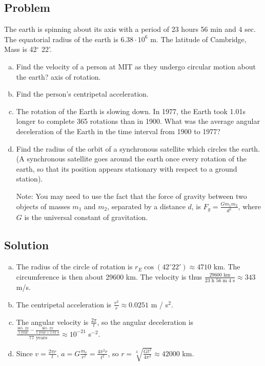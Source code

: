 \documentclass[solutions]{esg8012pset}
\begin{document}
\subsection{Problem}
  The earth is spinning about its axis with a period of 23 hours 56 min and 4 sec. The equatorial radius of the earth is $6.38\cdot 10^{6}$ m. The latitude of Cambridge, Mass is 42$^{\circ}$ 22'.
  \begin{enumerate}[a)]
    \item Find the velocity of a person at MIT as they undergo circular motion about the earth? axis of rotation.
    \item Find the person's centripetal acceleration.
    \item The rotation of the Earth is slowing down. In 1977, the Earth took 1.01s longer to complete 365 rotations than in 1900. What was the average angular deceleration of the Earth in the time interval from 1900 to 1977?
    \item Find the radius of the orbit of a synchronous satellite which circles the earth. (A synchronous satellite goes around the earth once every rotation of the earth, so that its position appears stationary with respect to a ground station).  \par\noindent
      Note: You may need to use the fact that the force of gravity between two objects of masses $m_1$ and $m_2$, separated by a distance $d$, is $F_g = \frac{G m_1 m_2}{d^2}$, where $G$ is the universal constant of gravitation.
  \end{enumerate}
\subsection{Solution}
  \begin{enumerate}[a)]
    \item The radius of the circle of rotation is $r_E \cos(42^{\circ} 22') \approx 4710$ km.  The circumference is then about 29600 km.  The velocity is thus $\frac{29600\text{ km}}{23\text{ h }56\text{ m }4\text{ s}} \approx 343$ m/s.
    \item The centripetal acceleration is $\frac{v^2}{r} \approx 0.0251$ m / s$^2$.
    \item The angular velocity is $\frac{2\pi}{t}$, so the angular deceleration is $\frac{\frac{365\cdot 2\pi}{1\text{ year}} - \frac{365\cdot 2\pi}{1\text{ year}+1.01\text{ s}}}{77\text{ years}} \approx 10^{-21}$ s$^{-2}$.
    \item Since $v = \frac{2\pi r}{t}$, $a = G\frac{m_e}{r^2} = \frac{4\pi^2 r}{t^2}$, so $r = \sqrt[3]{\frac{G t^2}{4\pi^2}} \approx 42000$ km.
  \end{enumerate}
\end{document}
